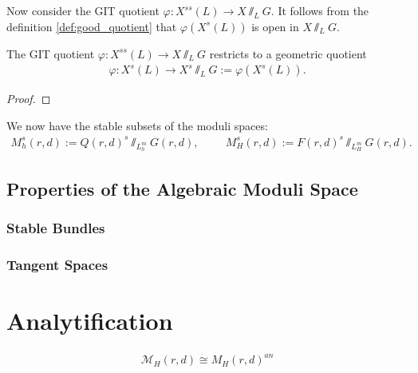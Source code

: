 \documentclass[12pt]{ociamthesis}  %
\begin{document}
Now consider the GIT quotient $\varphi : X^{ss}(L)\to X\sslash_L G$.
It follows from the definition \ref{def:good_quotient} that
$\varphi(X^s(L))$ is open in $X\sslash_L G$.

\begin{theorem}
  The GIT quotient $\varphi : X^{ss}(L) \to X\sslash_L G$
  restricts to a geometric quotient
  \begin{align*}
    \varphi : X^s(L) \to X^s\sslash_L G := \varphi(X^s(L)).
  \end{align*}
  \begin{proof}
    \missingproof
  \end{proof}
\end{theorem}

\begin{example}
  We now have the stable subsets of the moduli spaces:
  \begin{align*}
    M^{s}_h(r,d) := Q(r,d)^s\sslash_{L^m_h} G(r,d), \hspace{1cm}
    M^{s}_H(r,d) := F(r,d)^s\sslash_{L^m_H} G(r,d).
  \end{align*}

  \missingexample
\end{example}

\missingsection

\section{Properties of the Algebraic Moduli Space}

\subsection{Stable Bundles}

\subsection{Tangent Spaces}

\chapter{Analytification}

\begin{theorem}
  \begin{align*}
    \mathcal M_H(r,d) \cong M_H(r,d)^{an}
  \end{align*}
\end{theorem}
\end{document}
